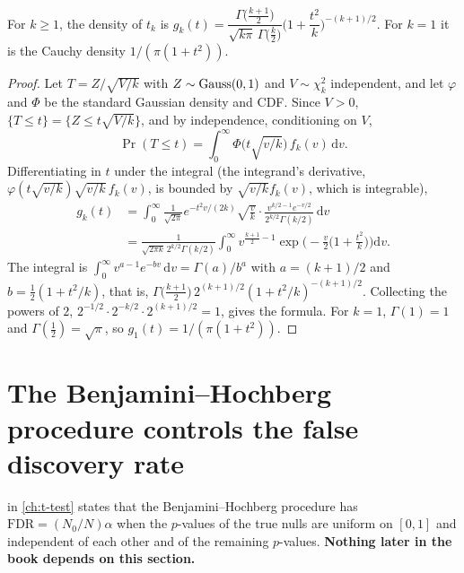 \begin{proposition}
For $k \geq 1$, the density of $t_k$ is $g_k(t) = \dfrac{\Gamma\big(\frac{k+1}{2}\big)}{\sqrt{k\pi}\,\Gamma\big(\frac{k}{2}\big)}\Big(1 + \dfrac{t^2}{k}\Big)^{-(k+1)/2}$.
For $k = 1$ it is the Cauchy density $1/(\pi(1 + t^2))$.
\end{proposition}
\begin{proof}
Let $T = Z/\sqrt{V/k}$ with $Z \sim \text{Gauss}(0,1)$ and $V \sim \chi^2_k$ independent, and let $\varphi$ and $\Phi$ be the standard Gaussian density and CDF.
Since $V > 0$, $\{T \leq t\} = \{Z \leq t\sqrt{V/k}\}$, and by independence, conditioning on $V$,
\[
\Pr(T \leq t) = \int_0^\infty \Phi\big(t\sqrt{v/k}\big)\,f_k(v)\,\mathrm{d}v.
\]
Differentiating in $t$ under the integral (the integrand's derivative, $\varphi(t\sqrt{v/k})\sqrt{v/k}\,f_k(v)$, is bounded by $\sqrt{v/k}f_k(v)$, which is integrable),
\begin{align*}
g_k(t) &= \int_0^\infty \frac{1}{\sqrt{2\pi}}e^{-t^2 v/(2k)}\sqrt{\frac{v}{k}}\cdot\frac{v^{k/2-1}e^{-v/2}}{2^{k/2}\Gamma(k/2)}\,\mathrm{d}v \\
&= \frac{1}{\sqrt{2\pi k}\,2^{k/2}\Gamma(k/2)}\int_0^\infty v^{\frac{k+1}{2} - 1}\exp\Big(-\frac{v}{2}\Big(1 + \frac{t^2}{k}\Big)\Big)\mathrm{d}v.
\end{align*}
The integral is $\int_0^\infty v^{a-1}e^{-bv}\,\mathrm{d}v = \Gamma(a)/b^a$ with $a = (k+1)/2$ and $b = \frac12(1 + t^2/k)$, that is, $\Gamma\big(\frac{k+1}{2}\big)\,2^{(k+1)/2}(1 + t^2/k)^{-(k+1)/2}$.
Collecting the powers of $2$, $2^{-1/2}\cdot 2^{-k/2}\cdot 2^{(k+1)/2} = 1$, gives the formula.
For $k = 1$, $\Gamma(1) = 1$ and $\Gamma(\frac12) = \sqrt{\pi}$, so $g_1(t) = 1/(\pi(1 + t^2))$.
\end{proof}

\section{The Benjamini--Hochberg procedure controls the false discovery rate}
\label{sec:proof-bh}

 in \cref{ch:t-test} states that the Benjamini--Hochberg procedure has $\mathrm{FDR} = (N_0/N)\alpha$ when the $p$-values of the true nulls are uniform on $[0,1]$ and independent of each other and of the remaining $p$-values.
\textbf{Nothing later in the book depends on this section.}

